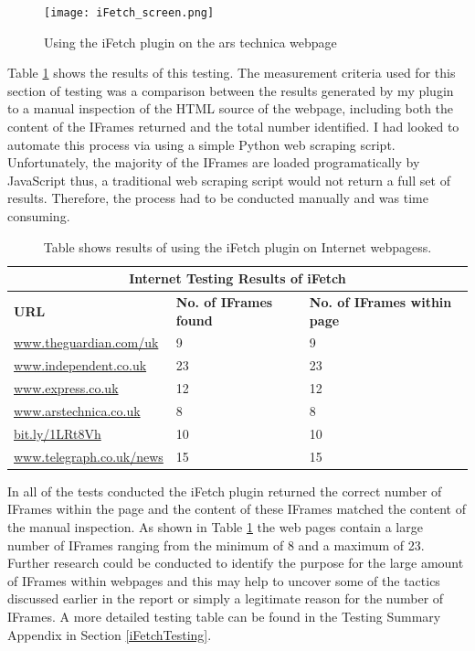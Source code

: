\documentclass[12pt]{article}
\begin{document}
\begin{figure}[H]
    \centering
    \texttt{[image: iFetch\_screen.png]}
    \caption{Using the iFetch plugin on the ars technica webpage}
    \label{fig:iFetch_screen}
\end{figure}

Table \ref{table:3} shows the results of this testing. The measurement criteria used for this section of testing was a comparison between the results generated by my plugin to a manual inspection of the HTML source of the webpage, including both the content of the IFrames returned and the total number identified. I had looked to automate this process via using a simple Python web scraping script. Unfortunately, the majority of the IFrames are loaded programatically by JavaScript thus, a traditional web scraping script would not return a full set of results. Therefore, the process had to be conducted manually and was time consuming.

{
\begin{table} [H]
\centering
\begin{tabular}{ |p{5cm}|p{5cm}|p{5cm}|  }
\hline
\multicolumn{3}{|c|}{\textbf{Internet Testing Results of iFetch}} \\
\hline
\textbf{URL} & \textbf{No. of IFrames found} & \textbf{No. of IFrames within page} \\
\hline
\url{www.theguardian.com/uk} & 9 & 9  \\
\hline
\url{www.independent.co.uk} & 23 & 23  \\
\hline
\url{www.express.co.uk} & 12 & 12 \\
\hline
\url{www.arstechnica.co.uk} & 8 & 8  \\
\hline
\url{bit.ly/1LRt8Vh} & 10 & 10 \\
\hline
\url{www.telegraph.co.uk/news} & 15 & 15 \\
\hline
\end{tabular}
\caption{Table shows results of using the iFetch plugin on Internet webpagess.}
\label{table:3}
\end{table}
}

In all of the tests conducted the iFetch plugin returned the correct number of IFrames within the page and the content of these IFrames matched the content of the manual inspection. As shown in Table \ref{table:3} the web pages contain a large number of IFrames ranging from the minimum of 8 and a maximum of 23. Further research could be conducted to identify the purpose for the large amount of IFrames within webpages and this may help to uncover some of the tactics discussed earlier in the report or simply a legitimate reason for the number of IFrames. A more detailed testing table can be found in the Testing Summary Appendix in Section \ref{iFetchTesting}.   
\end{document}
